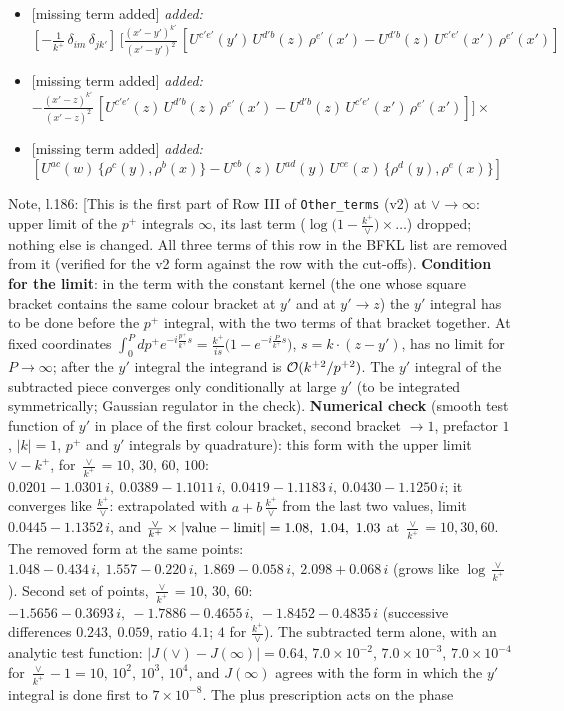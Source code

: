 \documentclass[10pt]{article}
\newenvironment{notebox}{\def\FrameCommand{{\color{notebar}\vrule width 1.5pt}\hspace{6pt}}\MakeFramed{\advance\hsize-\width\FrameRestore}\small}{\endMakeFramed}
\begin{document}
\begin{itemize}[leftmargin=2.2em,itemsep=1pt,topsep=2pt]
\item[\textbf{l.184}] \textsf{\small [missing term added]} \emph{added:} $\displaystyle [-\frac{1}{k^{+}}\, \delta_{im}\, \delta_{jk'}]\, \Bigg[\frac{(x'-y')^{k'}}{(x'-y')^{2}}\,[U^{c'e'}(y')\,U^{d'b}(z)\,\rho^{e'}(x')-U^{d'b}(z)\,U^{c'e'}(x')\,\rho^{e'}(x')]$
\item[\textbf{l.184}] \textsf{\small [missing term added]} \emph{added:} $\displaystyle -\frac{(x'-z)^{k'}}{(x'-z)^{2}}\,[U^{c'e'}(z)\,U^{d'b}(z)\,\rho^{e'}(x')-U^{d'b}(z)\,U^{c'e'}(x')\,\rho^{e'}(x')]\Bigg]\times$
\item[\textbf{l.184}] \textsf{\small [missing term added]} \emph{added:} $\displaystyle [U^{ac}(w)\, \{\rho^{c}(y),\rho^{b}(x)\}-U^{cb}(z)\,U^{ad}(y)\,U^{ce}(x)\,\{\rho^{d}(y),\rho^{e}(x)\}]$
\end{itemize}
\begin{notebox}\textsf{\small Note, l.186:} [This is the first part of Row III of \texttt{Other\_terms} (v2) at $\vee\to\infty$: upper limit of the $p^{+}$ integrals $\infty$, its last term ($\log\big(1-\frac{k^{+}}{\vee}\big)\times\dots$) dropped; nothing else is changed. All three terms of this row in the BFKL list are removed from it (verified for the v2 form against the row with the cut-offs). \textbf{Condition for the limit}: in the term with the constant kernel (the one whose square bracket contains the same colour bracket at $y'$ and at $y'\to z$) the $y'$ integral has to be done before the $p^{+}$ integral, with the two terms of that bracket together. At fixed coordinates $\int_{0}^{P}dp^{+}e^{-i\frac{p^{+}}{k^{+}}s}=\frac{k^{+}}{is}\big(1-e^{-i\frac{P}{k^{+}}s}\big)$, $s=k\cdot(z-y')$, has no limit for $P\to\infty$; after the $y'$ integral the integrand is ${\cal O}(k^{+2}/p^{+2})$. The $y'$ integral of the subtracted piece converges only conditionally at large $y'$ (to be integrated symmetrically; Gaussian regulator in the check). \textbf{Numerical check} (smooth test function of $y'$ in place of the first colour bracket, second bracket $\to1$, prefactor $1$, $|k|=1$, $p^{+}$ and $y'$ integrals by quadrature): this form with the upper limit $\vee-k^{+}$, for $\frac{\vee}{k^{+}}=10,\,30,\,60,\,100$: $0.0201-1.0301\,i,\ 0.0389-1.1011\,i,\ 0.0419-1.1183\,i,\ 0.0430-1.1250\,i$; it converges like $\frac{k^{+}}{\vee}$: extrapolated with $a+b\,\frac{k^{+}}{\vee}$ from the last two values, limit $0.0445-1.1352\,i$, and $\frac{\vee}{k^{+}}\times|{\rm value}-{\rm limit}|=1.08,\ 1.04,\ 1.03$ at $\frac{\vee}{k^{+}}=10,30,60$. The removed form at the same points: $1.048-0.434\,i,\ 1.557-0.220\,i,\ 1.869-0.058\,i,\ 2.098+0.068\,i$ (grows like $\log\frac{\vee}{k^{+}}$). Second set of points, $\frac{\vee}{k^{+}}=10,\,30,\,60$: $-1.5656-0.3693\,i,\ -1.7886-0.4655\,i,\ -1.8452-0.4835\,i$ (successive differences $0.243,\ 0.059$, ratio $4.1$; $4$ for $\frac{k^{+}}{\vee}$). The subtracted term alone, with an analytic test function: $|J(\vee)-J(\infty)|=0.64$, $7.0\times10^{-2}$, $7.0\times10^{-3}$, $7.0\times10^{-4}$ for $\frac{\vee}{k^{+}}-1=10,\,10^{2},\,10^{3},\,10^{4}$, and $J(\infty)$ agrees with the form in which the $y'$ integral is done first to $7\times10^{-8}$. The plus prescription acts on the phase 
\end{document}
